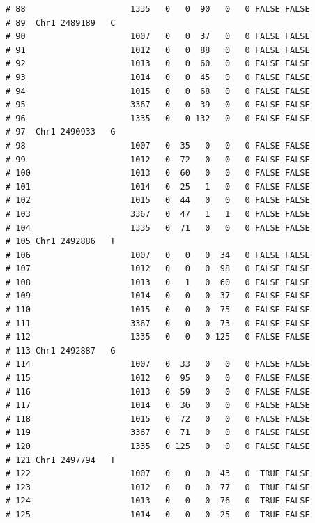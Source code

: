 \documentclass{article}\usepackage[]{graphicx}\usepackage[]{color}
\makeatletter
\newenvironment{kframe}{%
 \def\at@end@of@kframe{}%
 \ifinner\ifhmode%
  \def\at@end@of@kframe{\end{minipage}}%
  \begin{minipage}{\columnwidth}%
 \fi\fi%
 \def\FrameCommand##1{\hskip\@totalleftmargin \hskip-\fboxsep
 \colorbox{shadecolor}{##1}\hskip-\fboxsep
     \hskip-\linewidth \hskip-\@totalleftmargin \hskip\columnwidth}%
 \MakeFramed {\advance\hsize-\width
   \@totalleftmargin\z@ \linewidth\hsize
   \@setminipage}}%
 {\par\unskip\endMakeFramed%
 \at@end@of@kframe}
\newenvironment{knitrout}{}{} %
\makeatother
\begin{document}
\begin{knitrout}
\begin{kframe}
\begin{verbatim}
# 88                     1335   0   0  90   0   0 FALSE FALSE        
# 89  Chr1 2489189   C                                               
# 90                     1007   0   0  37   0   0 FALSE FALSE        
# 91                     1012   0   0  88   0   0 FALSE FALSE        
# 92                     1013   0   0  60   0   0 FALSE FALSE        
# 93                     1014   0   0  45   0   0 FALSE FALSE        
# 94                     1015   0   0  68   0   0 FALSE FALSE        
# 95                     3367   0   0  39   0   0 FALSE FALSE        
# 96                     1335   0   0 132   0   0 FALSE FALSE        
# 97  Chr1 2490933   G                                               
# 98                     1007   0  35   0   0   0 FALSE FALSE        
# 99                     1012   0  72   0   0   0 FALSE FALSE        
# 100                    1013   0  60   0   0   0 FALSE FALSE        
# 101                    1014   0  25   1   0   0 FALSE FALSE        
# 102                    1015   0  44   0   0   0 FALSE FALSE        
# 103                    3367   0  47   1   1   0 FALSE FALSE        
# 104                    1335   0  71   0   0   0 FALSE FALSE        
# 105 Chr1 2492886   T                                               
# 106                    1007   0   0   0  34   0 FALSE FALSE        
# 107                    1012   0   0   0  98   0 FALSE FALSE        
# 108                    1013   0   1   0  60   0 FALSE FALSE        
# 109                    1014   0   0   0  37   0 FALSE FALSE        
# 110                    1015   0   0   0  75   0 FALSE FALSE        
# 111                    3367   0   0   0  73   0 FALSE FALSE        
# 112                    1335   0   0   0 125   0 FALSE FALSE        
# 113 Chr1 2492887   G                                               
# 114                    1007   0  33   0   0   0 FALSE FALSE        
# 115                    1012   0  95   0   0   0 FALSE FALSE        
# 116                    1013   0  59   0   0   0 FALSE FALSE        
# 117                    1014   0  36   0   0   0 FALSE FALSE        
# 118                    1015   0  72   0   0   0 FALSE FALSE        
# 119                    3367   0  71   0   0   0 FALSE FALSE        
# 120                    1335   0 125   0   0   0 FALSE FALSE        
# 121 Chr1 2497794   T                                               
# 122                    1007   0   0   0  43   0  TRUE FALSE        
# 123                    1012   0   0   0  77   0  TRUE FALSE        
# 124                    1013   0   0   0  76   0  TRUE FALSE        
# 125                    1014   0   0   0  25   0  TRUE FALSE        

\end{verbatim}
\end{kframe}
\end{knitrout}
\end{document}
